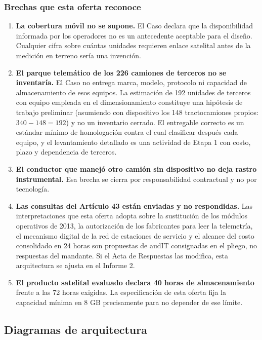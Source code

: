 \subsubsection{Brechas que esta oferta reconoce}

\begin{enumerate}
    \item \textbf{La cobertura móvil no se supone.} El Caso declara que la disponibilidad informada
    por los operadores no es un antecedente aceptable para el diseño. Cualquier cifra sobre cuántas
    unidades requieren enlace satelital antes de la medición en terreno sería una invención.
    \item \textbf{El parque telemático de los 226 camiones de terceros no se inventaría.} El Caso
    no entrega marca, modelo, protocolo ni capacidad de almacenamiento de esos equipos. La estimación
    de 192 unidades de terceros con equipo empleada en el dimensionamiento constituye una hipótesis
    de trabajo preliminar (asumiendo con dispositivo los 148 tractocamiones propios: $340 - 148 = 192$)
    y no un inventario cerrado. El entregable correcto es un estándar mínimo de homologación contra el cual
    clasificar después cada equipo, y el levantamiento detallado es una actividad de Etapa 1 con costo,
    plazo y dependencia de terceros.
    \item \textbf{El conductor que manejó otro camión sin dispositivo no deja rastro
    instrumental.} Esa brecha se cierra por responsabilidad contractual y no por tecnología.
    \item \textbf{Las consultas del Artículo 43 están enviadas y no respondidas.} Las
    interpretaciones que esta oferta adopta sobre la sustitución de los módulos operativos de 2013,
    la autorización de los fabricantes para leer la telemetría, el mecanismo digital de la red de
    estaciones de servicio y el alcance del costo consolidado en 24 horas son propuestas de audIT
    consignadas en el pliego, no respuestas del mandante. Si el Acta de Respuestas las modifica,
    esta arquitectura se ajusta en el Informe 2.
    \item \textbf{El producto satelital evaluado declara 40 horas de almacenamiento}
    \parencite{webfleet_sat} frente a las 72 horas exigidas. La especificación de esta oferta fija
    la capacidad mínima en 8 GB precisamente para no depender de ese límite.
\end{enumerate}


\subsection{Diagramas de arquitectura}


